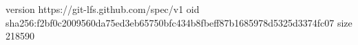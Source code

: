 version https://git-lfs.github.com/spec/v1
oid sha256:f2bf0c2009560da75ed3eb65750bfc434b8fbeff87b1685978d5325d3374fc07
size 218590
